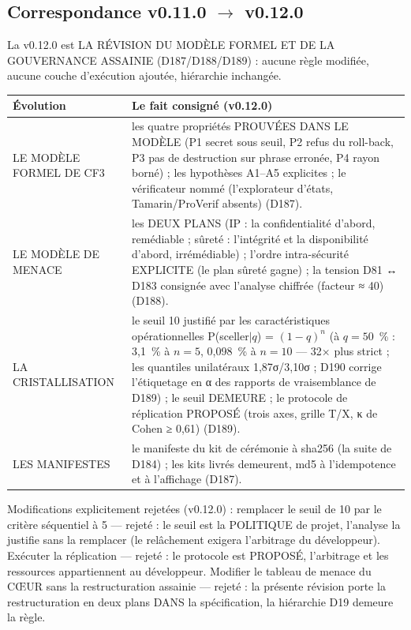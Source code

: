 \subsection{Correspondance v0.11.0 $\to$ v0.12.0}\label{sec:evolutions120}

La v0.12.0 est LA RÉVISION DU MODÈLE FORMEL ET DE LA GOUVERNANCE
ASSAINIE (D187/D188/D189) : aucune règle modifiée, aucune couche
d'exécution ajoutée, hiérarchie inchangée.

\begin{table}[tbp]
\centering
\small
\begin{tabularx}{\textwidth}{>{\raggedright\arraybackslash}p{3.4cm} X}
\textbf{Évolution} & \textbf{Le fait consigné (v0.12.0)} \\
\midrule
LE MODÈLE FORMEL DE CF3 & les quatre propriétés PROUVÉES DANS LE MODÈLE
(P1 secret sous seuil, P2 refus du roll-back, P3 pas de destruction sur
phrase erronée, P4 rayon borné) ; les hypothèses A1--A5 explicites ; le
vérificateur nommé (l'explorateur d'états, Tamarin/ProVerif absents)
(D187). \\
LE MODÈLE DE MENACE & les DEUX PLANS (IP : la confidentialité d'abord,
remédiable ; sûreté : l'intégrité et la disponibilité d'abord,
irrémédiable) ; l'ordre intra-sécurité EXPLICITE (le plan sûreté gagne) ;
la tension D81 ↔ D183 consignée avec l'analyse chiffrée (facteur ≈ 40)
(D188). \\
LA CRISTALLISATION & le seuil 10 justifié par les caractéristiques
opérationnelles P(sceller$|q$) = $(1-q)^n$ (à $q = 50$~\% : 3,1~\%
à $n{=}5$, 0,098~\% à $n{=}10$ — 32× plus strict ; les quantiles
unilatéraux 1,87σ/3,10σ ; D190 corrige l'étiquetage en α des rapports
de vraisemblance de D189) ; le seuil DEMEURE ; le
protocole de réplication PROPOSÉ (trois axes, grille T/X, κ de Cohen ≥
0,61) (D189). \\
LES MANIFESTES & le manifeste du kit de cérémonie à sha256 (la suite de
D184) ; les kits livrés demeurent, md5 à l'idempotence et à l'affichage
(D187). \\
\end{tabularx}
\end{table}

Modifications explicitement rejetées (v0.12.0) : remplacer le seuil de
10 par le critère séquentiel à 5 — rejeté : le seuil est la POLITIQUE de
projet, l'analyse la justifie sans la remplacer (le relâchement exigera
l'arbitrage du développeur). Exécuter la réplication — rejeté : le
protocole est PROPOSÉ, l'arbitrage et les ressources appartiennent au
développeur. Modifier le tableau de menace du CŒUR sans la restructuration
assainie — rejeté : la présente révision porte la restructuration en deux
plans DANS la spécification, la hiérarchie D19 demeure la règle.

